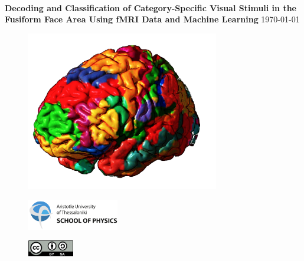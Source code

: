 \begin{titlepage}
\noindent\makebox[\linewidth]{\rule{\textwidth}{0.5pt}}\\[0.2cm]
\LARGE{\textbf{Decoding and Classification of Category-Specific Visual Stimuli in the Fusiform Face Area Using fMRI Data and Machine Learning}}
\noindent\makebox[\linewidth]{\rule{\textwidth}{0.5pt}}\vspace{0.2cm}
\vspace{2pt}
\large\today

\begin{figure}[H]
    \centering
    \includegraphics[height=7cm]{assets/images/brain_segmentation.png}
    \label{fig:brain_segmentation}
\end{figure}
\vspace{-16pt}

\vspace*{\fill}
\begin{minipage}[t]{0.5\textwidth}
\begin{figure}[H]
    \includegraphics[width=4cm,left]{assets/logo/PhysicsLogo_English.pdf}
\end{figure}
\end{minipage}
\begin{minipage}[t]{0.49\textwidth}
\begin{figure}[H]
    \includegraphics[width=2cm,right]{assets/license/by-sa.png}
\end{figure}
\end{minipage}

\end{titlepage}

